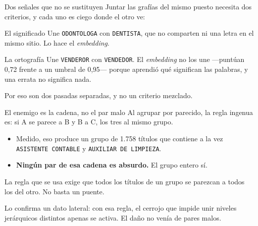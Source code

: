\documentclass[11pt]{beamer}
\begin{document}
\begin{frame}{Dos señales que no se sustituyen}
Juntar las grafías del mismo puesto necesita dos criterios, y cada uno es ciego
donde el otro ve:
\vspace{0.8em}
\begin{block}{El significado}
Une \texttt{ODONTOLOGA} con \texttt{DENTISTA}, que no comparten ni una letra en
el mismo sitio. Lo hace el \textit{embedding}.
\end{block}
\begin{block}{La ortografía}
Une \texttt{VENDEROR} con \texttt{VENDEDOR}. El \textit{embedding} \alert{no}
los une ---puntúan 0,72 frente a un umbral de 0,95--- porque aprendió qué
significan las palabras, y una errata no significa nada.
\end{block}
\vspace{0.6em}
Por eso son dos pasadas separadas, y no un criterio mezclado.
\end{frame}

\begin{frame}{El enemigo es la cadena, no el par malo}
Al agrupar por parecido, la regla ingenua es: si A se parece a B y B a C, los
tres al mismo grupo.
\vspace{0.8em}
\begin{itemize}
\item Medido, eso produce un grupo de \alert{1.758} títulos que contiene a la
vez \texttt{ASISTENTE CONTABLE} y \texttt{AUXILIAR DE LIMPIEZA}.
\item \textbf{Ningún par de esa cadena es absurdo.} El grupo entero sí.
\end{itemize}
\vspace{0.8em}
La regla que se usa exige que \alert{todos} los títulos de un grupo se parezcan
a todos los del otro. No basta un puente.
\vspace{0.8em}

Lo confirma un dato lateral: con esa regla, el cerrojo que impide unir niveles
jerárquicos distintos apenas se activa. El daño no venía de pares malos.
\end{frame}
\end{document}
